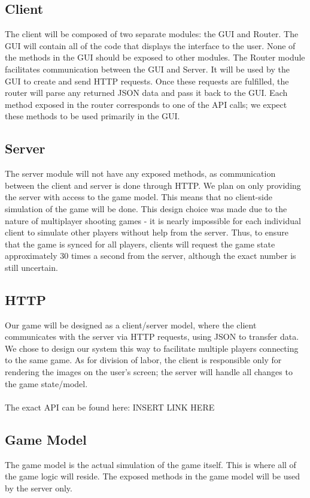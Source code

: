 \documentclass{article}
\begin{document}
	\subsection{Client}
	The client will be composed of two separate modules: the GUI and Router. The GUI will contain all of the code that displays the interface to the user. None of the methods in the GUI should be exposed to other modules. The Router module facilitates communication between the GUI and Server. It will be used by the GUI to create and send HTTP requests. Once these requests are fulfilled, the router will parse any returned JSON data and pass it back to the GUI. Each method exposed in the router corresponds to one of the API calls; we expect these methods to be used primarily in the GUI.
	
	\subsection{Server}
	The server module will not have any exposed methods, as communication between the client and server is done through HTTP. We plan on only providing the server with access to the game model. This means that no client-side simulation of the game will be done. This design choice was made due to the nature of multiplayer shooting games - it is nearly impossible for each individual client to simulate other players without help from the server. Thus, to ensure that the game is synced for all players, clients will request the game state approximately 30 times a second from the server, although the exact number is still uncertain. 
	
        \subsection{HTTP}
       	Our game will be designed as a client/server model, where the client communicates with the server via HTTP requests, using JSON to transfer data. We chose to design our system this way to facilitate multiple players connecting to the same game. As for division of labor, the client is responsible only for rendering the images on the user's screen; the server will handle all changes to the game state/model. \\
	\\
	The exact API can be found here: INSERT LINK HERE
	
	\subsection{Game Model}
    	The game model is the actual simulation of the game itself. This is where all of the game logic will reside. The exposed methods in the game model will be used by the server only.
	
\end{document}
